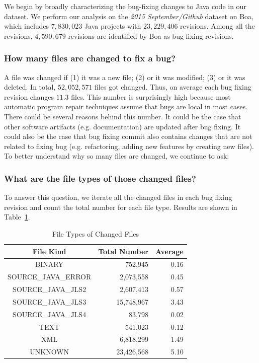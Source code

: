 \documentclass{sig-alternate-05-2015}
\begin{document}
We begin by broadly characterizing the bug-fixing changes to Java code in our
dataset.  We perform our analysis on the \emph{2015 September/Github} dataset on
Boa, which includes $7,830,023$ Java projects with $23,229,406$ revisions. Among
all the revisions, $4,590,679$ revisions are identified by Boa as bug fixing
revisions.

\subsubsection*{How many files are changed to fix a bug?} \vspace{-0.3em} 

A file was changed if (1) it was a new file; (2) or it was modified; (3) or it
was deleted. In total, $52,052,571$ files got changed. Thus, on average each bug
fixing revision changes $11.3$ files.  This number is surprisingly high because
most automatic program repair techniques assume that bugs are local in most
cases. There could be several reasons behind this number. It could be the case
that other software artifacts (e.g.  documentation) are updated after bug
fixing. It could also be the case that bug fixing commit also contains changes
that are not related to fixing bug (e.g. refactoring, adding new features by
creating new files). To better understand why so many files are changed, we
continue to ask:

\subsubsection*{What are the file types of those changed files?} \vspace{-0.3em}

To answer this question, we iterate all the changed files in each bug fixing
revision and count the total number for each file type. Results are shown in
Table~\ref{tbl:fileType}.

\begin{table}
\centering
  \begin{tabular}{| c | r | r |}
  \hline
  File Kind & Total Number & Average \\ \hline \hline
  BINARY & 752,945 & 0.16 \\ \hline
  SOURCE\_JAVA\_ERROR & 2,073,558 & 0.45 \\ \hline
  SOURCE\_JAVA\_JLS2 & 2,607,413 & 0.57 \\ \hline
  SOURCE\_JAVA\_JLS3 & 15,748,967 & 3.43 \\ \hline
  SOURCE\_JAVA\_JLS4 & 83,798 & 0.02 \\ \hline
  TEXT & 541,023 & 0.12 \\ \hline
  XML & 6,818,299 & 1.49 \\ \hline
  UNKNOWN & 23,426,568 & 5.10 \\ \hline
  \end{tabular}
  \caption{File Types of Changed Files}
  \label{tbl:fileType}
\end{table}
\end{document}
